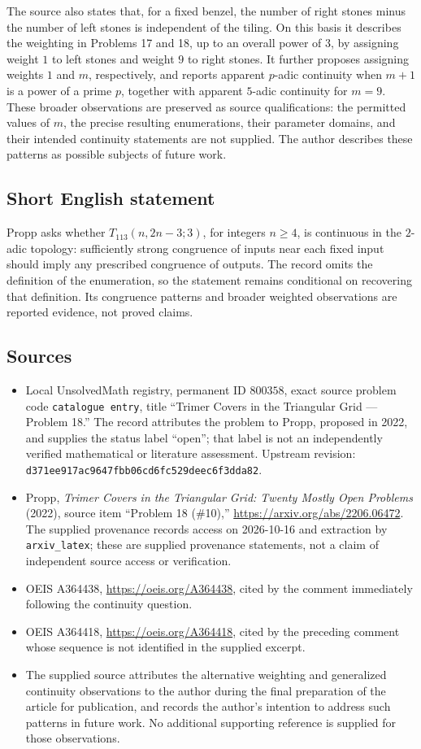 \documentclass[11pt]{article}
\begin{document}
The source also states that, for a fixed benzel, the number of right stones minus the number of left stones is independent of the tiling. On this basis it describes the weighting in Problems 17 and 18, up to an overall power of \(3\), by assigning weight \(1\) to left stones and weight \(9\) to right stones. It further proposes assigning weights \(1\) and \(m\), respectively, and reports apparent \(p\)-adic continuity when \(m+1\) is a power of a prime \(p\), together with apparent \(5\)-adic continuity for \(m=9\). These broader observations are preserved as source qualifications: the permitted values of \(m\), the precise resulting enumerations, their parameter domains, and their intended continuity statements are not supplied. The author describes these patterns as possible subjects of future work.
\subsection{Short English statement}
Propp asks whether \(T_{113}(n,2n-3;3)\), for integers \(n\geq4\), is continuous in the \(2\)-adic topology: sufficiently strong congruence of inputs near each fixed input should imply any prescribed congruence of outputs. The record omits the definition of the enumeration, so the statement remains conditional on recovering that definition. Its congruence patterns and broader weighted observations are reported evidence, not proved claims.
\subsection{Sources}
\begin{itemize}
\item Local UnsolvedMath registry, permanent ID \(800358\), exact source problem code \texttt{catalogue entry}, title ``Trimer Covers in the Triangular Grid --- Problem 18.'' The record attributes the problem to Propp, proposed in 2022, and supplies the status label ``open''; that label is not an independently verified mathematical or literature assessment. Upstream revision: \texttt{d371ee917ac9647fbb06cd6fc529deec6f3dda82}.
\item Propp, \emph{Trimer Covers in the Triangular Grid: Twenty Mostly Open Problems} (2022), source item ``Problem 18 (\#10),'' \url{https://arxiv.org/abs/2206.06472}. The supplied provenance records access on 2026-10-16 and extraction by \texttt{arxiv\_latex}; these are supplied provenance statements, not a claim of independent source access or verification.
\item OEIS A364438, \url{https://oeis.org/A364438}, cited by the comment immediately following the continuity question.
\item OEIS A364418, \url{https://oeis.org/A364418}, cited by the preceding comment whose sequence is not identified in the supplied excerpt.
\item The supplied source attributes the alternative weighting and generalized continuity observations to the author during the final preparation of the article for publication, and records the author's intention to address such patterns in future work. No additional supporting reference is supplied for those observations.
\end{itemize}
\end{document}

